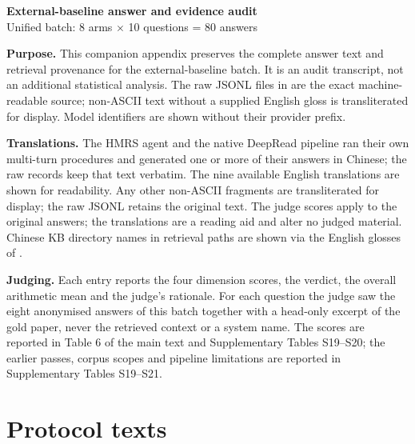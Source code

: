 \documentclass[10pt]{article}
\begin{document}
\begin{center}{\Large\bfseries External-baseline answer and evidence audit}\\[4pt]{\normalsize Unified batch: 8 arms $\times$ 10 questions = 80 answers}\end{center}
\textbf{Purpose.} This companion appendix preserves the complete answer text and retrieval provenance for the external-baseline batch. It is an audit transcript, not an additional statistical analysis. The raw JSONL files in  are the exact machine-readable source; non-ASCII text without a supplied English gloss is transliterated for display. Model identifiers are shown without their provider prefix.

\textbf{Translations.} The HMRS agent and the native DeepRead pipeline ran their own multi-turn procedures and generated one or more of their answers in Chinese; the raw records keep that text verbatim. The nine available English translations are shown for readability. Any other non-ASCII fragments are transliterated for display; the raw JSONL retains the original text. The judge scores apply to the original answers; the translations are a reading aid and alter no judged material. Chinese KB directory names in retrieval paths are shown via the English glosses of .

\textbf{Judging.} Each entry reports the four dimension scores, the verdict, the overall arithmetic mean and the judge's rationale. For each question the judge saw the eight anonymised answers of this batch together with a head-only excerpt of the gold paper, never the retrieved context or a system name. The scores are reported in Table 6 of the main text and Supplementary Tables S19--S20; the earlier passes, corpus scopes and pipeline limitations are reported in Supplementary Tables S19--S21.

\tableofcontents
\clearpage
\section*{Protocol texts}
\end{document}

